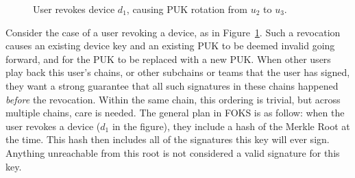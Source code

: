 \begin{figure}[ht]
  \centering
  \caption{User revokes device $d_1$, causing PUK rotation from $u_2$ to $u_3$.}
  \label{fig:revoke}
\end{figure}

Consider the case of a user revoking a device, as in Figure~\ref{fig:revoke}. Such a revocation
causes an existing device key and an existing PUK to be deemed invalid going forward, and 
for the PUK to be replaced with a new PUK. When other users play back this user's chains,
or other subchains or teams that the user has signed, they want a strong guarantee that
all such signatures in these chains happened \textit{before} the revocation. Within the same
chain, this ordering is trivial, but across multiple chains, care is needed. The general
plan in FOKS is as follow: when the user revokes a device ($d_1$ in the figure), they
include a hash of the Merkle Root at the time. This hash then includes all of the signatures
this key will ever sign. Anything unreachable from this root is not considered a valid
signature for this key.

